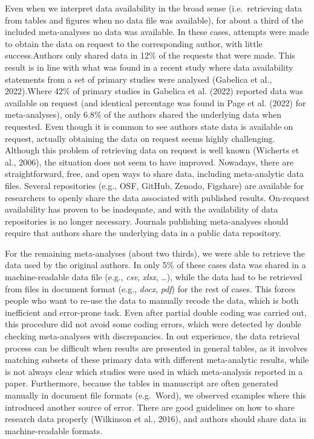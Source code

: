 \documentclass[
  ,jou, a4paper,floatsintext]{apa6}
\begin{document}
Even when we interpret data availability in the broad sense (i.e.~retrieving data from tables and figures when no data file was available), for about a third of the included meta-analyses no data was available. In these cases, attempts were made to obtain the data on request to the corresponding author, with little success.Authors only shared data in 12\% of the requests that were made. This result is in line with what was found in a recent study where data availability statements from a set of primary studies were analysed (Gabelica et al., 2022).Where 42\% of primary studies in Gabelica et al. (2022) reported data was available on request (and identical percentage was found in Page et al. (2022) for meta-analyses), only 6.8\% of the authors shared the underlying data when requested. Even though it is common to see authors state data is available on request, actually obtaining the data on request seems highly challenging. Although this problem of retrieving data on request is well known (Wicherts et al., 2006), the situation does not seem to have improved. Nowadays, there are straightforward, free, and open ways to share data, including meta-analytic data files. Several repositories (e.g., OSF, GitHub, Zenodo, Figshare) are available for researchers to openly share the data associated with published results. On-request availability has proven to be inadequate, and with the availability of data repositories is no longer necessary. Journals publishing meta-analyses should require that authors share the underlying data in a public data repository.

For the remaining meta-analyses (about two thirds), we were able to retrieve the data used by the original authors. In only 5\% of these cases data was shared in a machine-readable data file (e.g., \emph{csv}, \emph{xlsx}, \ldots), while the data had to be retrieved from files in document format (e.g., \emph{docx}, \emph{pdf}) for the rest of cases. This forces people who want to re-use the data to manually recode the data, which is both inefficient and error-prone task. Even after partial double coding was carried out, this procedure did not avoid some coding errors, which were detected by double checking meta-analyses with discrepancies. In out experience, the data retrieval process can be difficult when results are presented in general tables, as it involves matching subsets of these primary data with different meta-analytic results, while is not always clear which studies were used in which meta-analysis reported in a paper. Furthermore, because the tables in manuscript are often generated manually in document file formats (e.g.~Word), we observed examples where this introduced another source of error. There are good guidelines on how to share research data properly (Wilkinson et al., 2016), and authors should share data in machine-readable formats.
\end{document}
